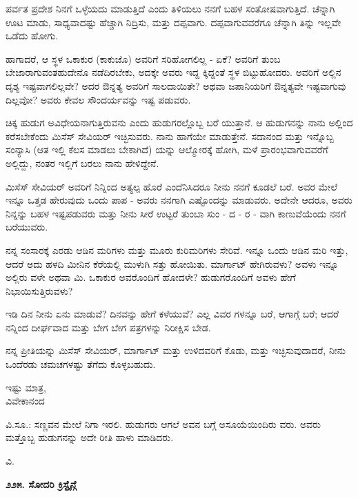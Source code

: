ಪರ್ವತ ಪ್ರದೇಶ ನಿನಗೆ ಒಳ್ಳೆಯದು ಮಾಡುತ್ತಿದೆ ಎಂದು ತಿಳಿಯಲು ನನಗೆ ಬಹಳ ಸಂತೋಷವಾಗುತ್ತಿದೆ. ಚೆನ್ನಾಗಿ ಊಟ ಮಾಡು, ಸಾಧ್ಯವಾದಷ್ಟು ಹೆಚ್ಚಾಗಿ ನಿದ್ರಿಸು, ಮತ್ತು ದಪ್ಪವಾಗು. ದಪ್ಪವಾಗುವವರೆಗೂ ಚೆನ್ನಾಗಿ ತಿನ್ನು ಇಲ್ಲವೇ ಒಡೆದು ಹೋಗು.

ಹಾಗಾದರೆ, ಆ ಸ್ಥಳ ಒಕಾಕುರ (ಕಾಕುಜೊ) ಅವರಿಗೆ ಸರಿಹೋಗಲಿಲ್ಲ - ಏಕೆ? ಅವರಿಗೆ ತುಂಬ ಬೇಜಾರಾಗುವಂತಹುದೇನೊ ನಡೆದಿರಬೇಕು, ಅದಕ್ಕೇ ಅವರು ಇದ್ದ ಕ್ಕಿದ್ದಂತೆ ಸ್ಥಳ ಬಿಟ್ಟುಹೋದರು. ಅವರಿಗೆ ಅಲ್ಲಿನ ದೃಶ್ಯ ಇಷ್ಟವಾಗಲಿಲ್ಲವೇ? ಅದರ ಔನ್ನತ್ಯ ಅವರಿಗೆ ಸಾಲದಾಯಿತೇ? ಅಥವಾ ಜಪಾನಿಯರಿಗೆ ಔನ್ನತ್ಯವೇ ಇಷ್ಟವಾಗುವು ದಿಲ್ಲವೋ? ಅವರು ಕೇವಲ ಸೌಂದರ್ಯವನ್ನು ಇಷ್ಟ ಪಡುವರು.

ಚಿಕ್ಕ ಹುಡುಗ ಅವಿಧೇಯನಾಗುತ್ತಿರುವನು ಎಂದು ಹುಡುಗರಲ್ಲೊಬ್ಬ ಬರೆ ಯುತ್ತಾನೆ. ಆ ಹುಡುಗನನ್ನು ನಾನು ಅಲ್ಲಿಂದ ಕರೆಸಬೇಕೆಂದು ಮಿಸೆಸ್ ಸೇವಿಯರ್ ಇಚ್ಛಿಸುವರು. ನಾನು ಹಾಗೆಯೇ ಮಾಡುತ್ತೇನೆ. ಸದಾನಂದ ಮತ್ತು ಇನ್ನೊಬ್ಬ ಸಂನ್ಯಾಸಿ (ಆತ ಇಲ್ಲಿ ಕೆಲಸ ಮಾಡಲು ಬೇಕಾಗಿದೆ) ಯನ್ನು ಆಲ್ಮೋರಕ್ಕೆ ಹೋಗಿ, ಮಳೆ ಪ್ರಾರಂಭವಾಗುವವರೆಗೆ ಅಲ್ಲಿದ್ದು, ನಂತರ ಇಲ್ಲಿಗೆ ಬರಲು ನಾನು ಹೇಳಿದ್ದೇನೆ.

ಮಿಸೆಸ್ ಸೇವಿಯರ್ ಅವರಿಗೆ ನಿನ್ನಿಂದ ಅತ್ಯಲ್ಪ ಹೊರೆ ಎಂದೆನಿಸಿದರೂ ನೀನು ನನಗೆ ಕೂಡಲೆ ಬರೆ. ಅವರ ಮೇಲೆ ಇನ್ನೂ ಒತ್ತಡ ಹೇರುವುದು ಒಂದು ಪಾಪ - ಅವರು ನನಗಾಗಿ ಎಷ್ಟೊಂದನ್ನು ಮಾಡುವರು. ಅದೇನೇ ಆದರೂ, ಅವರು ನಿನ್ನನ್ನು ಬಹಳ ಇಷ್ಟಪಡುವರು ಮತ್ತು ನೀನು ಸೀರೆ ಉಟ್ಟರೆ ತುಂಬಾ ಸುಂ - ದ - ರ - ವಾಗಿ ಕಾಣುವೆಯೆಂದು ನನಗೆ ಬರೆಯುವರು.

ನನ್ನ ಸಂಸಾರಕ್ಕೆ ಎರಡು ಆಡಿನ ಮರಿಗಳು ಮತ್ತು ಮೂರು ಕುರಿಮರಿಗಳು ಸೇರಿವೆ. ಇನ್ನೂ ಒಂದು ಆಡಿನ ಮರಿ ಇತ್ತು, ಆದರೆ ಅದು ಹಳದಿ ಮೀನಿನ ಕೆರೆಯಲ್ಲಿ ಮುಳುಗಿ ಸತ್ತು ಹೋಯಿತು. ಮಾರ್ಗಾಟ್ ಹೇಗಿರುವಳು? ಅವಳು ಇನ್ನೂ ಅಲ್ಲಿರು ವಳೇ ಅಥವಾ ಮಿ. ಒಕಾಕುರ ಅವರೊಂದಿಗೆ ಹೋದಳೇ? ಹುಡುಗರೊಂದಿಗೆ ಅವಳು ಹೇಗೆ ನಿಭಾಯಿಸುತ್ತಿರುವಳು?

ಇಡಿ ದಿನ ನೀನು ಏನು ಮಾಡುವೆ? ದಿನವನ್ನು ಹೇಗೆ ಕಳೆಯುವೆ? ಎಲ್ಲ ವಿವರ ಗಳನ್ನೂ ಬರೆ, ಆಗಾಗ್ಗೆ ಬರೆ; ಆದರೆ ನನ್ನಿಂದ ದೀರ್ಘವಾದ ಮತ್ತು ಬೇಗ ಬೇಗ ಪತ್ರಗಳನ್ನು ನಿರೀಕ್ಷಿಸ ಬೇಡ.

ನನ್ನ ಪ್ರೀತಿಯನ್ನು ಮಿಸೆಸ್ ಸೇವಿಯರ್, ಮಾರ್ಗಾಟ್ ಮತ್ತು ಉಳಿದವರಿಗೆ ಕೊಡು, ಮತ್ತು ಇಚ್ಛಿಸುವುದಾದರೆ, ನೀನು ಒಂದೆರಡು ಚಮಚಗಳಷ್ಟು ತೆಗೆದು ಕೊಳ್ಳಬಹುದು.

\begin{flushright}
ಇಷ್ಟು ಮಾತ್ರ,\\ವಿವೇಕಾನಂದ
\end{flushright}

ವಿ.ಸೂ.: ಸಣ್ಣವನ ಮೇಲೆ ನಿಗಾ ಇರಲಿ. ಹುಡುಗರು ಆಗಲೆ ಅವನ ಬಗ್ಗೆ ಅಸೂಯೆಯಿಂದಿರು ವರು. ಅವರು ಮತ್ತೊಬ್ಬ ಹುಡುಗನನ್ನು ಅದೇ ರೀತಿ ಹಾಳು ಮಾಡಿದರು.

\begin{flushright}
ವಿ.
\end{flushright}

\begin{center}
\textbf{೨೨೫. ಸೋದರಿ ಕ್ರಿಸ್ಟೈನ್ಗೆ}
\end{center}

